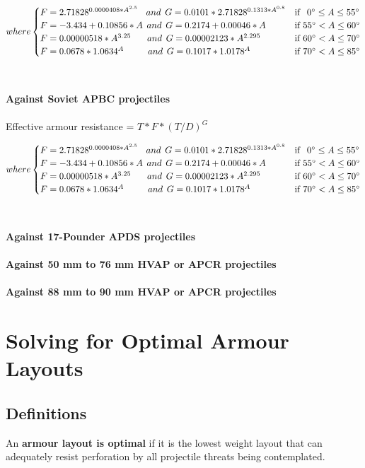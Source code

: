 \documentclass[]{article}
\begin{document}
\[
where
\begin{cases}

F=2.71828^{0.0000408*A^{2.5}}\:\:\:\:and\:\:G=0.0101*2.71828^{0.1313*A^{0.8}} & \text{if \:\:$0\degree \leq A\leq55\degree$} \\
F=-3.434+0.10856*A\:\:and\:\:G=0.2174 + 0.00046*A & \text{if $55\degree<A\leq60\degree$} \\
F=0.00000518*A^{3.25}\:\:\:\:\:\:\:\:and\:\:G=0.00002123*A^{2.295} & \text{if $60\degree<A\leq70\degree$} \\
F=0.0678*1.0634^A\:\:\:\:\:\:\:\:\:\:\:\:and\:\:G=0.1017*1.0178^A & \text{if $70\degree<A\leq85\degree$}

\end{cases}
\]
\\\\
\noindent \textbf{Against Soviet APBC projectiles}
\\\\
Effective armour resistance = $T*F*(T/D)^G$

\[
where
\begin{cases}

F=2.71828^{0.0000408*A^{2.5}}\:\:\:\:and\:\:G=0.0101*2.71828^{0.1313*A^{0.8}} & \text{if \:\:$0\degree \leq A\leq55\degree$} \\
F=-3.434+0.10856*A\:\:and\:\:G=0.2174 + 0.00046*A & \text{if $55\degree<A\leq60\degree$} \\
F=0.00000518*A^{3.25}\:\:\:\:\:\:\:\:and\:\:G=0.00002123*A^{2.295} & \text{if $60\degree<A\leq70\degree$} \\
F=0.0678*1.0634^A\:\:\:\:\:\:\:\:\:\:\:\:and\:\:G=0.1017*1.0178^A & \text{if $70\degree<A\leq85\degree$}

\end{cases}
\]
\\\\
\noindent \textbf{Against 17-Pounder APDS projectiles}
\\\\
\noindent \textbf{Against 50 mm to 76 mm HVAP or APCR projectiles}
\\\\
\noindent \textbf{Against 88 mm to 90 mm HVAP or APCR projectiles}





\section{Solving for Optimal Armour Layouts}
\subsection{Definitions}
\noindent An \textbf{armour layout is optimal} if it is the lowest weight layout that can adequately resist perforation by all projectile threats being contemplated.
\\
\end{document}
